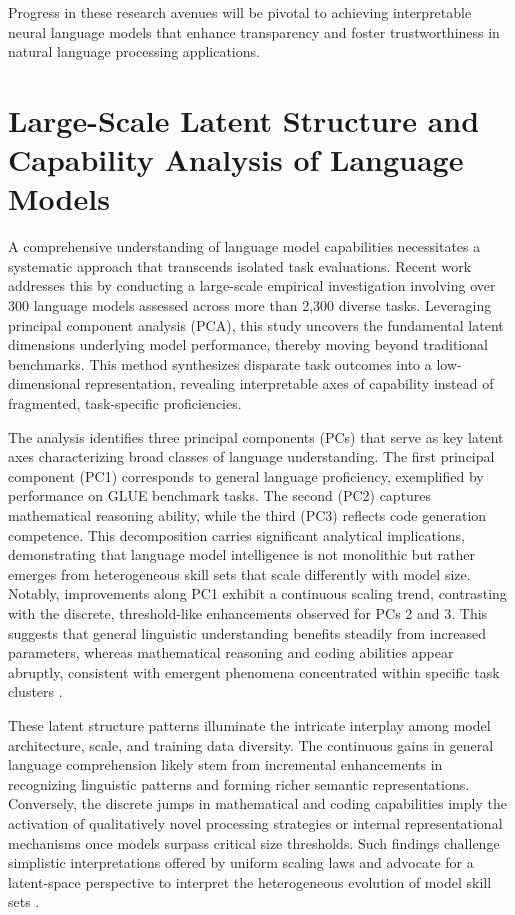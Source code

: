 \documentclass[sigconf]{acmart}
\begin{document}
Progress in these research avenues will be pivotal to achieving interpretable neural language models that enhance transparency and foster trustworthiness in natural language processing applications.

\section{Large-Scale Latent Structure and Capability Analysis of Language Models}

A comprehensive understanding of language model capabilities necessitates a systematic approach that transcends isolated task evaluations. Recent work \cite{ref45} addresses this by conducting a large-scale empirical investigation involving over 300 language models assessed across more than 2,300 diverse tasks. Leveraging principal component analysis (PCA), this study uncovers the fundamental latent dimensions underlying model performance, thereby moving beyond traditional benchmarks. This method synthesizes disparate task outcomes into a low-dimensional representation, revealing interpretable axes of capability instead of fragmented, task-specific proficiencies.

The analysis identifies three principal components (PCs) that serve as key latent axes characterizing broad classes of language understanding. The first principal component (PC1) corresponds to general language proficiency, exemplified by performance on GLUE benchmark tasks. The second (PC2) captures mathematical reasoning ability, while the third (PC3) reflects code generation competence. This decomposition carries significant analytical implications, demonstrating that language model intelligence is not monolithic but rather emerges from heterogeneous skill sets that scale differently with model size. Notably, improvements along PC1 exhibit a continuous scaling trend, contrasting with the discrete, threshold-like enhancements observed for PCs 2 and 3. This suggests that general linguistic understanding benefits steadily from increased parameters, whereas mathematical reasoning and coding abilities appear abruptly, consistent with emergent phenomena concentrated within specific task clusters \cite{ref45}.

These latent structure patterns illuminate the intricate interplay among model architecture, scale, and training data diversity. The continuous gains in general language comprehension likely stem from incremental enhancements in recognizing linguistic patterns and forming richer semantic representations. Conversely, the discrete jumps in mathematical and coding capabilities imply the activation of qualitatively novel processing strategies or internal representational mechanisms once models surpass critical size thresholds. Such findings challenge simplistic interpretations offered by uniform scaling laws and advocate for a latent-space perspective to interpret the heterogeneous evolution of model skill sets \cite{ref45}.
\end{document}
